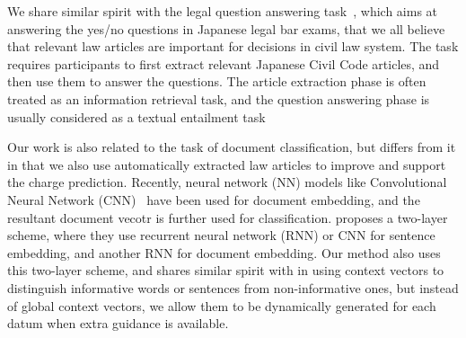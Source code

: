 

We share similar spirit with the legal question answering task~\cite{COLIEE14}, which aims at answering the yes/no questions in Japanese legal bar exams, that we all believe that relevant law articles are important for decisions in civil law system. 
The task requires participants to first extract relevant Japanese Civil Code articles, and then use them to answer the questions. 
The article extraction phase is often treated as an information retrieval task, and the question answering phase is usually considered as a textual entailment task~\cite{kim2014legal,kimconvolutional}

Our work is also related to the task of document classification, but differs from it in that we also use automatically extracted law articles to improve and support the charge prediction.
Recently, neural network (NN) models like Convolutional Neural Network (CNN)~\cite{kim2014convolutional} have been used for document embedding, and the resultant document vecotr is further used for classification.
\cite{tang2015document} proposes a two-layer scheme, where they use recurrent neural network (RNN) or CNN for sentence embedding, and another RNN for document embedding.
Our method also uses this two-layer scheme, and shares similar spirit with \cite{yang2016hierarchical} in using context vectors to distinguish informative words or sentences from non-informative ones, but instead of global context vectors, we allow them to be dynamically generated for each datum when extra guidance is available.

